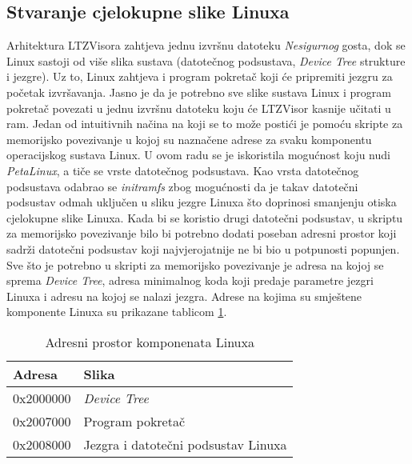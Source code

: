 \documentclass[times, utf8, diplomski, numeric]{fer}
\begin{document}
\subsection{Stvaranje cjelokupne slike Linuxa}
Arhitektura LTZVisora zahtjeva jednu izvršnu datoteku \textit{Nesigurnog} gosta, dok se Linux sastoji od više slika sustava (datotečnog
podsustava, \textit{Device Tree} strukture i jezgre). Uz to, Linux zahtjeva i program pokretač koji će pripremiti jezgru za
početak izvršavanja. Jasno je da je potrebno sve slike sustava Linux i program pokretač povezati u jednu izvršnu datoteku
koju će LTZVisor kasnije učitati u \gls{ram}. Jedan od intuitivnih načina na koji se to može postići je pomoću skripte za memorijsko
povezivanje u kojoj su naznačene adrese za svaku komponentu operacijskog sustava Linux. U ovom radu se je iskoristila mogućnost
koju nudi \textit{PetaLinux}, a tiče se vrste datotečnog podsustava. Kao vrsta datotečnog podsustava odabrao se
\textit{initramfs} zbog mogućnosti da je takav datotečni podsustav odmah uključen u sliku jezgre Linuxa što doprinosi smanjenju
otiska cjelokupne slike Linuxa. Kada bi se koristio drugi datotečni podsustav, u skriptu za memorijsko povezivanje bilo bi
potrebno dodati poseban adresni prostor koji sadrži datotečni podsustav koji najvjerojatnije ne bi bio u potpunosti popunjen.
Sve što je potrebno u skripti za memorijsko povezivanje je adresa na kojoj se sprema \textit{Device Tree}, adresa minimalnog
koda koji predaje parametre jezgri Linuxa i adresu na kojoj se nalazi jezgra. Adrese na kojima su smještene komponente Linuxa
su prikazane tablicom \ref{adr_space}.

\begin{table}[H]
  \centering
  \begin{tabular}{ | p{3cm} | p{6cm} |}
    \hline
    \textbf{Adresa} & \textbf{Slika}\\
    \hline
    0x2000000 & \textit{Device Tree}\\
    \hline
    0x2007000 & Program pokretač\\
    \hline
    0x2008000 & Jezgra i datotečni podsustav  Linuxa\\
    \hline
  \end{tabular}
  \caption{Adresni prostor komponenata Linuxa}
  \label{adr_space}
\end{table}
\end{document}
